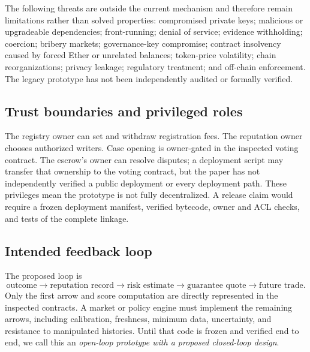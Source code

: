 The following threats are outside the current mechanism and therefore remain limitations rather than
solved properties: compromised private keys; malicious or upgradeable dependencies; front-running;
denial of service; evidence withholding; coercion; bribery markets; governance-key compromise;
contract insolvency caused by forced Ether or unrelated balances; token-price volatility; chain
reorganizations; privacy leakage; regulatory treatment; and off-chain enforcement. The legacy
prototype has not been independently audited or formally verified.

\subsection{Trust boundaries and privileged roles}
The registry owner can set and withdraw registration fees. The reputation owner chooses authorized
writers. Case opening is owner-gated in the inspected voting contract. The escrow's owner can resolve
disputes; a deployment script may transfer that ownership to the voting contract, but the paper has
not independently verified a public deployment or every deployment path. These privileges mean the
prototype is not fully decentralized. A release claim would require a frozen deployment manifest,
verified bytecode, owner and ACL checks, and tests of the complete linkage.

\subsection{Intended feedback loop}
The proposed loop is
\[
  \text{outcome}\to\text{reputation record}\to\text{risk estimate}
  \to\text{guarantee quote}\to\text{future trade}.
\]
Only the first arrow and score computation are directly represented in the inspected contracts. A
market or policy engine must implement the remaining arrows, including calibration, freshness,
minimum data, uncertainty, and resistance to manipulated histories. Until that code is frozen and
verified end to end, we call this an \emph{open-loop prototype with a proposed closed-loop design}.
